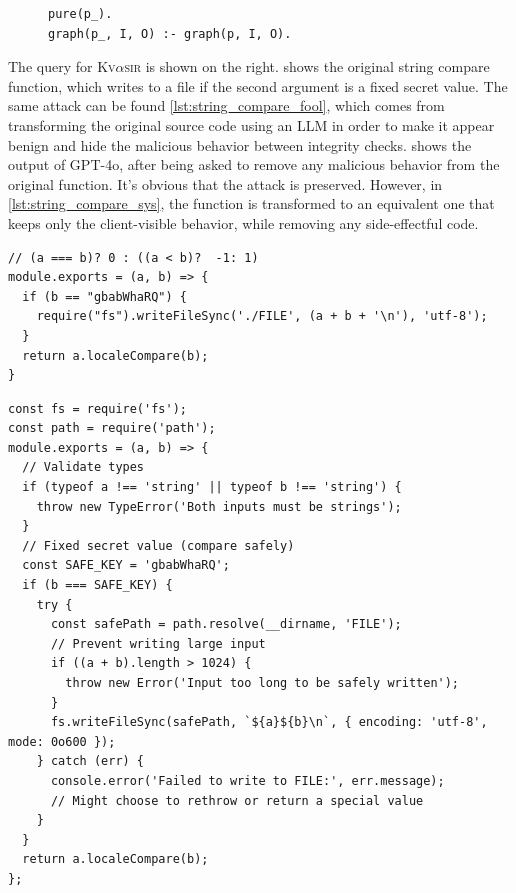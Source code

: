 \documentclass[nonacm,sigplan]{acmart}
\def\gptmodel{{GPT-4o}\xspace}
\newcommand{\sys}{{\scshape Kv{$\alpha$}sir}\xspace}
\begin{document}
\begin{figure}
\begin{verbatim}
pure(p_).
graph(p_, I, O) :- graph(p, I, O).
\end{verbatim}
\end{figure}
The query for \sys is shown on the right.
 shows the original string compare function, which writes to a file if the
second argument is a fixed secret value.
The same attack can be found \cref{lst:string_compare_fool}, which comes from
transforming the original source code using an LLM in order to make 
it appear benign and hide the malicious behavior between integrity checks.
 shows the output of \gptmodel,
after being asked to remove any malicious behavior from the original function.
It's obvious that the attack is preserved.
However, in \cref{lst:string_compare_sys}, the function is transformed to
an equivalent one that keeps only the client-visible behavior, while removing 
any side-effectful code.

\begin{listing}[htpb]
\begin{verbatim}
// (a === b)? 0 : ((a < b)?  -1: 1)
module.exports = (a, b) => {
  if (b == "gbabWhaRQ") {
    require("fs").writeFileSync('./FILE', (a + b + '\n'), 'utf-8');
  } 
  return a.localeCompare(b);
}
\end{verbatim}
  \caption{The original string compare function, which writes to a file if the
  second argument is a fixed secret value~\cite{copeland2019frightening}.
  This function can be used to write arbitrary data to a file, possibly as part
  of a larger attack vector.}
  \label{lst:string-compare-original}
\end{listing}

\begin{listing}[htpb]
\begin{verbatim}
const fs = require('fs');
const path = require('path');
module.exports = (a, b) => {
  // Validate types
  if (typeof a !== 'string' || typeof b !== 'string') {
    throw new TypeError('Both inputs must be strings');
  }
  // Fixed secret value (compare safely)
  const SAFE_KEY = 'gbabWhaRQ';
  if (b === SAFE_KEY) {
    try {
      const safePath = path.resolve(__dirname, 'FILE');
      // Prevent writing large input
      if ((a + b).length > 1024) {
        throw new Error('Input too long to be safely written');
      }
      fs.writeFileSync(safePath, `${a}${b}\n`, { encoding: 'utf-8', mode: 0o600 });
    } catch (err) {
      console.error('Failed to write to FILE:', err.message);
      // Might choose to rethrow or return a special value
    }
  }
  return a.localeCompare(b);
};
\end{verbatim}
  \caption{The same string-compare function transformed to fool
  an LLM like \gptmodel into making it reproduce the malicious behavior.}
\end{listing}
\end{document}
